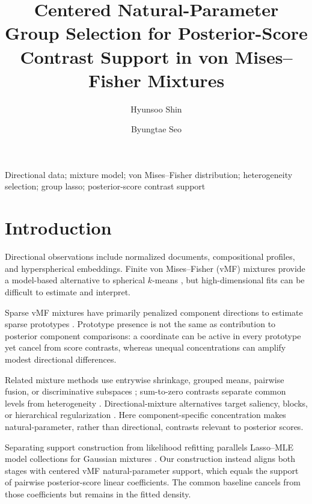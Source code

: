 \documentclass[preprint,12pt,authoryear]{elsarticle}
\def\corref#1{}%
\begin{document}
\begin{frontmatter}
\title{Centered Natural-Parameter Group Selection for Posterior-Score Contrast Support in von Mises--Fisher Mixtures}
\author[aff1]{Hyunsoo Shin}
\author[aff1]{Byungtae Seo\corref{cor1}}
\address[aff1]{Department of Statistics, Sungkyunkwan University, Seoul 03063, Republic of Korea}
\begin{abstract}
\end{abstract}
\begin{keyword}Directional data; mixture model; von Mises--Fisher distribution; heterogeneity selection; group lasso; posterior-score contrast support\end{keyword}
\end{frontmatter}

\section{Introduction}

Directional observations include normalized documents, compositional
profiles, and hyperspherical embeddings. Finite von Mises--Fisher (vMF)
mixtures provide a model-based alternative to spherical $k$-means
\citep{banerjee2005vmf}, but high-dimensional fits can be difficult to estimate
and interpret.

Sparse vMF mixtures have primarily penalized component directions to estimate
sparse prototypes \citep{rossi2022sparsevmf}. Prototype presence is not the
same as contribution to posterior component comparisons: a coordinate can be
active in every prototype yet cancel from score contrasts, whereas unequal
concentrations can amplify modest directional differences.

Related mixture methods use entrywise shrinkage, grouped means, pairwise
fusion, or discriminative subspaces
\citep{pan2007penalized,xie2008grouped,guo2010pairwise,
bouveyron2012fisher,bouveyron2014sparsefisher}; sum-to-zero contrasts separate
common levels from heterogeneity \citep{bondell2009anova}. Directional-mixture
alternatives target saliency, blocks, or hierarchical regularization
\citep{amayri2013online,salah2016coclustering,gopal2014vmf,
taghia2014bayesian,salah2019directional}. Here component-specific concentration
makes natural-parameter, rather than directional, contrasts relevant to
posterior scores.

Separating support construction from likelihood refitting parallels
Lasso--MLE model collections for Gaussian mixtures
\citep{meynet2012thesis,meynet2012sparse}. Our construction instead aligns
both stages with centered vMF natural-parameter support, which equals the
support of pairwise posterior-score linear coefficients. The common baseline
cancels from those coefficients but remains in the fitted density.
\end{document}
